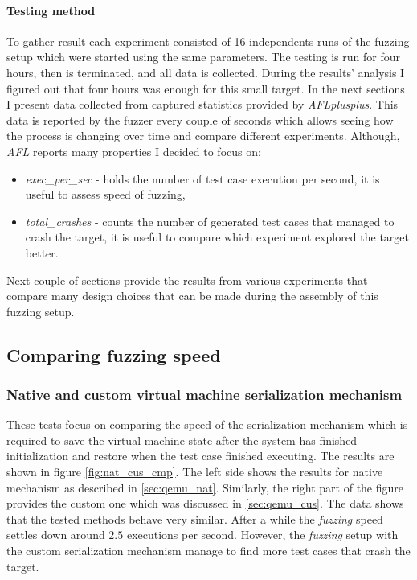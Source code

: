 \paragraph{Testing method}
To gather result each experiment consisted of 16 independents runs of the fuzzing setup which were started using the same parameters. The testing is run for four hours, then is terminated, and all data is collected. During the results' analysis I figured out that four hours was enough for this small target. In the next sections I present data collected from captured statistics provided by \textit{AFLplusplus}. This data is reported by the fuzzer every couple of seconds which allows seeing how the process is changing over time and compare different experiments. Although, \textit{AFL} reports many properties I decided to focus on:
\begin{itemize}
    \item \textit{exec\_per\_sec} - holds the number of test case execution per second, it is useful to assess speed of fuzzing,
    \item \textit{total\_crashes} - counts the number of generated test cases that managed to crash the target, it is useful to compare which experiment explored the target better.
\end{itemize}
Next couple of sections provide the results from various experiments that compare many design choices that can be made during the assembly of this fuzzing setup.

\subsection{Comparing fuzzing speed}

\subsubsection{Native and custom virtual machine serialization mechanism}

These tests focus on comparing the speed of the serialization mechanism which is required to save the virtual machine state after the system has finished initialization and restore when the test case finished executing. The results are shown in figure \ref{fig:nat_cus_cmp}. The left side shows the results for native mechanism as described in \ref{sec:qemu_nat}. Similarly, the right part of the figure provides the custom one which was discussed in \ref{sec:qemu_cus}. The data shows that the tested methods behave very similar. After a while the \textit{fuzzing} speed settles down around $2.5$ executions per second. However, the \textit{fuzzing} setup with the custom serialization mechanism manage to find more test cases that crash the target.

